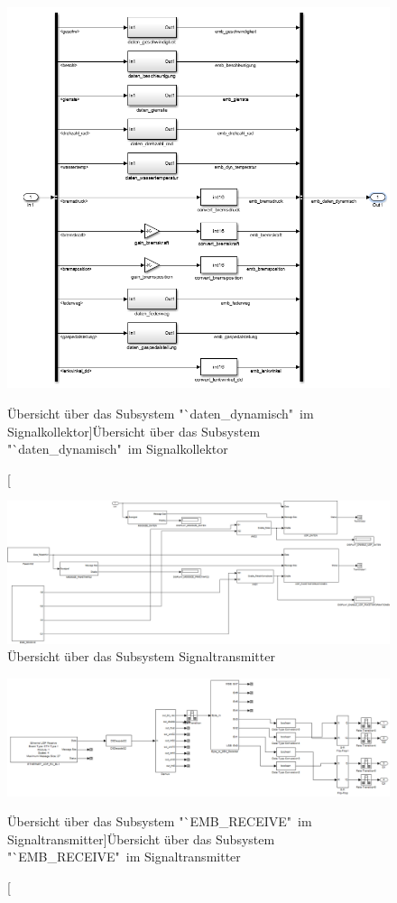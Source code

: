 \documentclass[fontsize = 12pt, paper = a4]{scrreprt}
\begin{document}
\begin{figure}[h]
\centering
\includegraphics[scale = 0.77]{sc_daten_dynamisch}
\caption[Übersicht über das Subsystem "`daten\_dynamisch"\ im Signalkollektor]{Übersicht über das Subsystem "`daten\_dynamisch"\ im Signalkollektor}
\label{scdatendynamisch}
\end{figure}

\newpage

\begin{figure}
\centering
\includegraphics[scale = 0.50]{subsignaltransmitter}
\caption[Übersicht über das Subsystem Signaltransmitter]{Übersicht über das Subsystem Signaltransmitter}
\label{subsignaltransmitter}
\end{figure}

\newpage

\begin{figure}
\centering
\includegraphics[scale = 0.60]{subembreceive}
\caption[Übersicht über das Subsystem "`EMB\_RECEIVE"\ im Signaltransmitter]{Übersicht über das Subsystem "`EMB\_RECEIVE"\ im Signaltransmitter}
\label{subembreceive}
\end{figure}
\end{document}
